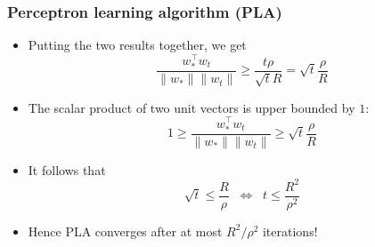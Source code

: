 \documentclass[10pt]{beamer}
\begin{document}
\begin{frame}
  \frametitle{Perceptron learning algorithm (PLA)}
  \begin{itemize}
  \item Putting the two results together, we get
  \[
  \frac {w_*^\top w_t} {\lVert w_* \rVert \lVert w_t \rVert} \geq \frac {t\rho} {\sqrt{t}R} = \sqrt{t} \frac \rho R
  \]
  \pause
  \item The scalar product of two unit vectors is upper bounded by $1$:
  \[
	1 \geq \frac {w_*^\top w_t} {\lVert w_* \rVert \lVert w_t \rVert} \geq \sqrt{t} \frac \rho R
  \]
  \pause
  \item It follows that
  \[
	\sqrt{t} \leq \frac R \rho \;\; \Leftrightarrow \;\; t \leq \frac {R^2} {\rho^2}
  \]
  \pause
  \item Hence PLA converges after at most $R^2/\rho^2$ iterations!
  \end{itemize}
\end{frame}
\end{document}
